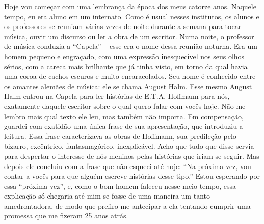 Hoje vou começar com uma lembrança da época dos meus catorze anos.
Naquele tempo, eu era aluno em um internato. Como é usual nesses
institutos, os alunos e os professores se reuniam várias vezes de noite
durante a semana para tocar música, ouvir um discurso ou ler a obra de
um escritor. Numa noite, o professor de música conduzia a ``Capela'' --
esse era o nome dessa reunião noturna. Era um homem pequeno e engraçado,
com uma expressão inesquecível nos seus olhos sérios, com a careca mais
brilhante que já tinha visto, em torno da qual havia uma coroa de cachos
escuros e muito encaracolados. Seu nome é conhecido entre os amantes
alemães de música: ele se chama August Halm. Esse mesmo August Halm
entrou na Capela para ler histórias de E.T.A. Hoffmann para nós,
exatamente daquele escritor sobre o qual quero falar com vocês hoje. Não
me lembro mais qual texto ele leu, mas também não importa. Em
compensação, guardei com exatidão uma única frase de sua apresentação,
que introduziu a leitura. Essa frase caracterizava as obras de Hoffmann,
sua predileção pelo bizarro, excêntrico, fantasmagórico, inexplicável.
Acho que tudo que disse servia para despertar o interesse de nós meninos
pelas histórias que iriam se seguir. Mas depois ele concluiu com a frase
que não esqueci até hoje: ``Na próxima vez, vou contar a vocês para que
alguém escreve histórias desse tipo.'' Estou esperando por essa
``próxima vez'', e, como o bom homem faleceu nesse meio tempo, essa
explicação só chegaria até mim se fosse de uma maneira um tanto
amedrontadora, de modo que prefiro me antecipar a ela tentando cumprir
uma promessa que me fizeram 25 anos atrás.

